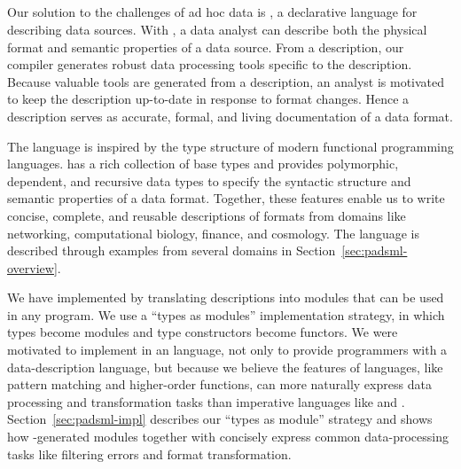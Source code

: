 
\subsection{\padsmlbig{}}

Our solution to the challenges of ad hoc data is \padsml{}, a
declarative language for describing data sources.  With \padsml{}, a
data analyst can describe both the physical format and semantic
properties of a data source.  From a \padsml{} description, our
compiler generates robust data processing tools specific to the
description.  Because valuable tools are generated from a description,
an analyst is motivated to keep the description up-to-date in response
to format changes.  Hence a \padsml{} description serves as accurate,
formal, and living documentation of a data format.


The \padsml{} language is inspired by the type structure of modern
functional programming languages.  \padsml{} has a rich collection of base
types and provides polymorphic, dependent, and recursive data types to
specify the syntactic structure and semantic properties of a data
format.  Together, these features enable us to write concise,
complete, and reusable descriptions of formats from domains like
networking, computational biology, finance, and cosmology.  The
\padsml{} language is described through examples from several domains
in Section~\ref{sec:padsml-overview}.


We have implemented \padsml{} by translating descriptions into
\ocaml{} modules that can be used in any \ocaml{} program.  We use a
``types as modules'' implementation strategy, in which \padsml{} types
become modules and \padsml{} type constructors become functors. 
We were motivated to implement \padsml{} in an \ml{} language, not
only to provide \ml{} programmers with a data-description language,
but because we believe the features of \ml{} languages, like pattern
matching and higher-order functions, can more naturally express data
processing and transformation tasks than imperative languages like
\C{} and \java{}.
Section~\ref{sec:padsml-impl} describes our ``types as module''
strategy and shows how \padsml{}-generated modules together
with \ocaml{} concisely express
common
data-processing tasks like filtering errors and format transformation.


